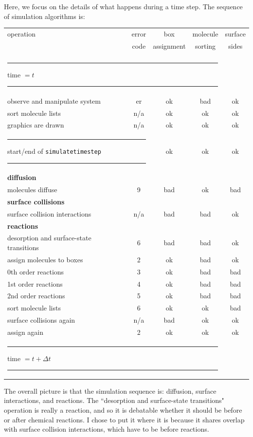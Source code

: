 \documentclass {scrbook}
\newcommand {\ttt} {\texttt}
\begin{document}
Here, we focus on the details of what happens during a time step. The sequence of simulation algorithms is:


\begin{longtable}[c]{lcccc}
operation&error&box&molecule&surface\\
&code&assignment&sorting&sides\\
\hline \\
\multicolumn{4}{l}{\rule{0.25in}{0.02in}time $=t$\rule{0.25in}{0.02in}}\\
observe and manipulate system&er&ok&bad&ok\\
sort molecule lists&n/a&ok&ok&ok\\
graphics are drawn&n/a&ok&ok&ok\\
\multicolumn{2}{l}{\rule{0.25in}{0.01in}start/end of \ttt{simulatetimestep}\rule{0.25in}{0.01in}}&ok&ok&ok\\
\textbf{diffusion}\\
molecules diffuse&9&bad&ok&bad\\
\textbf{surface collisions}\\
surface collision interactions&n/a&bad&bad&ok\\
\textbf{reactions}\\
desorption and surface-state transitions&6&bad&bad&ok\\
assign molecules to boxes&2&ok&bad&ok\\
0th order reactions&3&ok&bad&bad\\
1st order reactions&4&ok&bad&bad\\
2nd order reactions&5&ok&bad&bad\\
sort molecule lists&6&ok&ok&bad\\
surface collisions again&n/a&bad&ok&ok\\
assign again&2&ok&ok&ok\\
\multicolumn{4}{l}{\rule{0.25in}{0.02in}time $=t+\Delta t$\rule{0.25in}{0.02in}}\\
\end{longtable}

The overall picture is that the simulation sequence is: diffusion, surface interactions, and reactions. The ``desorption and surface-state transitions" operation is really a reaction, and so it is debatable whether it should be before or after chemical reactions. I chose to put it where it is because it shares overlap with surface collision interactions, which have to be before reactions.
\end{document}
